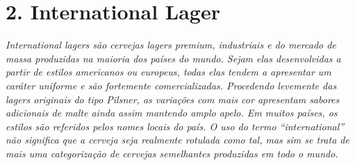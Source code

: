 \section*{2. International Lager}
\textit{International lagers são cervejas lagers premium, industriais e do mercado de massa produzidas na maioria dos países do mundo. Sejam elas desenvolvidas a partir de estilos americanos ou europeus, todas elas tendem a apresentar um caráter uniforme e são fortemente comercializadas. Procedendo levemente das lagers originais do tipo Pilsner, as variações com mais cor apresentam sabores adicionais de malte ainda assim mantendo amplo apelo. Em muitos países, os estilos são referidos pelos nomes locais do país. O uso do termo “international” não significa que a cerveja seja realmente rotulada como tal, mas sim se trata de mais uma categorização de cervejas semelhantes produzidas em todo o mundo.}
